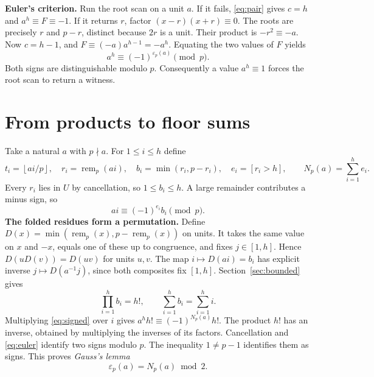 \documentclass[12pt,letterpaper]{article}
\newcommand{\sect}[1]{\section{\texorpdfstring{\color{accent}#1}{#1}}}
\newcommand{\lab}[1]{\textbf{#1.}\enspace}
\newcommand{\floor}[1]{\left\lfloor#1\right\rfloor}
\newcommand{\remn}{\operatorname{rem}}
\newcommand{\sgnbit}{\varepsilon}
\newcommand{\iv}[1]{[1,#1]}
\begin{document}
\lab{Euler's criterion} Run the root scan on a unit $a$. If it fails, \eqref{eq:pair} gives $c=h$ and $a^h\equiv F\equiv-1$. If it returns $r$, factor $(x-r)(x+r)\equiv0$. The roots are precisely $r$ and $p-r$, distinct because $2r$ is a unit. Their product is $-r^2\equiv-a$. Now $c=h-1$, and $F\equiv(-a)a^{h-1}=-a^h$. Equating the two values of $F$ yields
\begin{equation}\label{eq:euler}
       a^h\equiv (-1)^{\sgnbit_p(a)}\pmod p.
\end{equation}
Both signs are distinguishable modulo $p$. Consequently a value $a^h\equiv1$ forces the root scan to return a witness.
\clearpage
\sect{From products to floor sums}\label{sec:gauss}
Take a natural $a$ with $p\nmid a$. For $1\le i\le h$ define
\[
 t_i=\floor{ai/p},\quad r_i=\remn_p(ai),\quad
 b_i=\min(r_i,p-r_i),\quad e_i=[r_i>h],\qquad N_p(a)=\sum_{i=1}^h e_i.
\]
Every $r_i$ lies in $U$ by cancellation, so $1\le b_i\le h$. A large remainder contributes a minus sign, so
\begin{equation}\label{eq:signed}
         ai\equiv (-1)^{e_i}b_i\pmod p.
\end{equation}
\lab{The folded residues form a permutation} Define $D(x)=\min(\remn_p(x),p-\remn_p(x))$ on units. It takes the same value on $x$ and $-x$, equals one of these up to congruence, and fixes $j\in\iv h$. Hence $D(uD(v))=D(uv)$ for units $u,v$. The map $i\mapsto D(ai)=b_i$ has explicit inverse $j\mapsto D(a^{-1}j)$, since both composites fix $\iv h$. Section~\ref{sec:bounded} gives
\begin{equation}\label{eq:perm}
        \prod_{i=1}^h b_i=h!,\qquad \sum_{i=1}^h b_i=\sum_{i=1}^h i.
\end{equation}
Multiplying \eqref{eq:signed} over $i$ gives $a^h h!\equiv(-1)^{N_p(a)}h!$. The product $h!$ has an inverse, obtained by multiplying the inverses of its factors. Cancellation and \eqref{eq:euler} identify two signs modulo $p$. The inequality $1\ne p-1$ identifies them as signs. This proves \emph{Gauss's lemma}
\begin{equation}\label{eq:gauss}
             \sgnbit_p(a)=N_p(a)\bmod2.
\end{equation}
\end{document}
